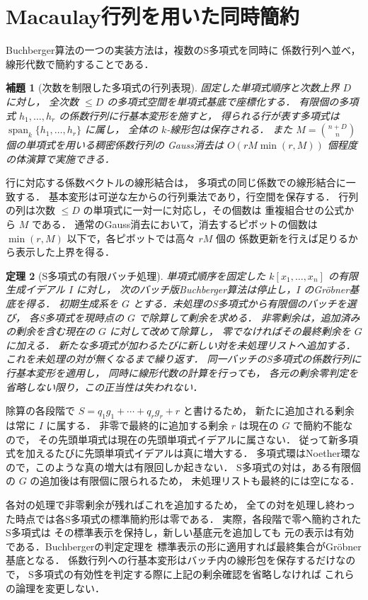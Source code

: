 \documentclass[a5paper,10pt,onecolumn]{jsarticle}
\makeatletter
\theoremstyle{mathnotetheorem}
\newtheorem{theorem}{定理}[section]
\newtheorem{lemma}[theorem]{補題}
\renewcommand{\proofname}{証明}
\renewenvironment{proof}[1][\proofname]{%
  \par\pushQED{\qed}\normalfont\topsep4\p@\@plus2\p@\relax
  \trivlist\item[\hskip\labelsep\bfseries #1]\ignorespaces
}{\popQED\endtrivlist\@endpefalse}
\makeatother
\begin{document}
\section{Macaulay行列を用いた同時簡約}
Buchberger算法の一つの実装方法は，複数のS多項式を同時に
係数行列へ並べ，線形代数で簡約することである．
\begin{lemma}[次数を制限した多項式の行列表現]
固定した単項式順序と次数上界 $D$ に対し，
全次数 $\le D$ の多項式空間を単項式基底で座標化する．
有限個の多項式 $h_1,\ldots,h_r$ の係数行列に行基本変形を施すと，
得られる行が表す多項式は
$\operatorname{span}_k\{h_1,\ldots,h_r\}$ に属し，
全体の $k$-線形包は保存される．
また $M={n+D\choose n}$ 個の単項式を用いる稠密係数行列の
Gauss消去は $O(rM\min(r,M))$ 個程度の体演算で実施できる．
\end{lemma}
\begin{proof}
行に対応する係数ベクトルの線形結合は，
多項式の同じ係数での線形結合に一致する．
基本変形は可逆な左からの行列乗法であり，行空間を保存する．
行列の列は次数 $\le D$ の単項式に一対一に対応し，その個数は
重複組合せの公式から $M$ である．
通常のGauss消去において，消去するピボットの個数は
$\min(r,M)$ 以下で，各ピボットでは高々 $rM$ 個の
係数更新を行えば足りるから表示した上界を得る．
\end{proof}
\begin{theorem}[S多項式の有限バッチ処理]
単項式順序を固定した $k[x_1,\ldots,x_n]$ の有限生成イデアル $I$ に対し，
次のバッチ版Buchberger算法は停止し，$I$ のGr\"obner基底を得る．
初期生成系を $G$ とする．未処理のS多項式から有限個のバッチを選び，
各S多項式を現時点の $G$ で除算して剰余を求める．
非零剰余は，追加済みの剰余を含む現在の $G$ に対して改めて除算し，
零でなければその最終剰余を $G$ に加える．
新たな多項式が加わるたびに新しい対を未処理リストへ追加する．
これを未処理の対が無くなるまで繰り返す．
同一バッチのS多項式の係数行列に行基本変形を適用し，
同時に線形代数の計算を行っても，
各元の剰余零判定を省略しない限り，この正当性は失われない．
\end{theorem}
\begin{proof}
除算の各段階で $S=q_1g_1+\cdots+q_rg_r+r$ と書けるため，
新たに追加される剰余は常に $I$ に属する．
非零で最終的に追加する剰余 $r$ は現在の $G$ で簡約不能なので，
その先頭単項式は現在の先頭単項式イデアルに属さない．
従って新多項式を加えるたびに先頭単項式イデアルは真に増大する．
多項式環はNoether環なので，このような真の増大は有限回しか起きない．
S多項式の対は，ある有限個の $G$ の追加後は有限個に限られるため，
未処理リストも最終的には空になる．

各対の処理で非零剰余が残ればこれを追加するため，
全ての対を処理し終わった時点では各S多項式の標準簡約形は零である．
実際，各段階で零へ簡約されたS多項式は
その標準表示を保持し，新しい基底元を追加しても
元の表示は有効である．Buchbergerの判定定理を
標準表示の形に適用すれば最終集合がGr\"obner基底となる．
係数行列への行基本変形はバッチ内の線形包を保存するだけなので，
S多項式の有効性を判定する際に上記の剰余確認を省略しなければ
これらの論理を変更しない．
\end{proof}
\end{document}
